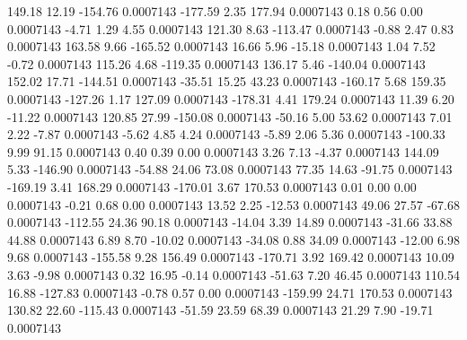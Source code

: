       149.18       12.19     -154.76     0.0007143
     -177.59        2.35      177.94     0.0007143
        0.18        0.56        0.00     0.0007143
       -4.71        1.29        4.55     0.0007143
      121.30        8.63     -113.47     0.0007143
       -0.88        2.47        0.83     0.0007143
      163.58        9.66     -165.52     0.0007143
       16.66        5.96      -15.18     0.0007143
        1.04        7.52       -0.72     0.0007143
      115.26        4.68     -119.35     0.0007143
      136.17        5.46     -140.04     0.0007143
      152.02       17.71     -144.51     0.0007143
      -35.51       15.25       43.23     0.0007143
     -160.17        5.68      159.35     0.0007143
     -127.26        1.17      127.09     0.0007143
     -178.31        4.41      179.24     0.0007143
       11.39        6.20      -11.22     0.0007143
      120.85       27.99     -150.08     0.0007143
      -50.16        5.00       53.62     0.0007143
        7.01        2.22       -7.87     0.0007143
       -5.62        4.85        4.24     0.0007143
       -5.89        2.06        5.36     0.0007143
     -100.33        9.99       91.15     0.0007143
        0.40        0.39        0.00     0.0007143
        3.26        7.13       -4.37     0.0007143
      144.09        5.33     -146.90     0.0007143
      -54.88       24.06       73.08     0.0007143
       77.35       14.63      -91.75     0.0007143
     -169.19        3.41      168.29     0.0007143
     -170.01        3.67      170.53     0.0007143
        0.01        0.00        0.00     0.0007143
       -0.21        0.68        0.00     0.0007143
       13.52        2.25      -12.53     0.0007143
       49.06       27.57      -67.68     0.0007143
     -112.55       24.36       90.18     0.0007143
      -14.04        3.39       14.89     0.0007143
      -31.66       33.88       44.88     0.0007143
        6.89        8.70      -10.02     0.0007143
      -34.08        0.88       34.09     0.0007143
      -12.00        6.98        9.68     0.0007143
     -155.58        9.28      156.49     0.0007143
     -170.71        3.92      169.42     0.0007143
       10.09        3.63       -9.98     0.0007143
        0.32       16.95       -0.14     0.0007143
      -51.63        7.20       46.45     0.0007143
      110.54       16.88     -127.83     0.0007143
       -0.78        0.57        0.00     0.0007143
     -159.99       24.71      170.53     0.0007143
      130.82       22.60     -115.43     0.0007143
      -51.59       23.59       68.39     0.0007143
       21.29        7.90      -19.71     0.0007143
